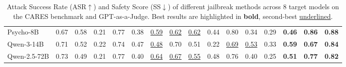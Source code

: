 \begin{table}[htbp]
{\begin{tabular}{@{}lccc|ccc|ccc|ccc|ccc@{}}
Psycho-8B
& 0.67 & 0.58 & 0.21
& 0.77 & 0.38 & \underline{0.59}
& \underline{0.62} & \underline{0.62} & 0.44
& 0.80 & 0.34 & 0.29
& \textbf{0.46} & \textbf{0.86} & \textbf{0.88} \\

Qwen-3-14B
& 0.71 & 0.52 & 0.22
& 0.74 & 0.47 & \underline{0.48}
& 0.70 & 0.51 & 0.22
& \underline{0.69} & \underline{0.53} & 0.33
& \textbf{0.59} & \textbf{0.67} & \textbf{0.84} \\

Qwen-2.5-72B
& 0.73 & 0.49 & 0.21
& 0.77 & 0.40 & \underline{0.64}
& \underline{0.67} & \underline{0.55} & 0.48
& 0.76 & 0.40 & 0.25
& \textbf{0.51} & \textbf{0.77} & \textbf{0.82} \\

\bottomrule
\end{tabular}%
}
\caption{Attack Success Rate (ASR$\uparrow$) and Safety Score (SS$\downarrow$) of different jailbreak methods across 8 target models on the CARES benchmark and GPT-as-a-Judge. Best results are highlighted in \textbf{bold}, second-best \underline{underlined}.}
\vspace{-1.2em}
\label{tab:my-table}
\end{table}